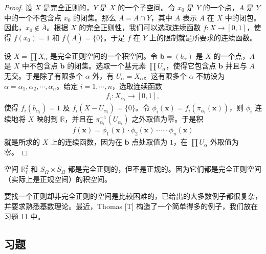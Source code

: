 \begin{proof}
设 $X$ 是完全正则的，$Y$ 是 $X$ 的一个子空间。令 $x_{0}$ 是 $Y$ 的一个点，$A$ 是 $Y$ 中的一个不包含点 $x_{0}$ 的闭集。那么 $A=\overline{A}\cap Y$，其中 $\overline{A}$ 表示 $A$ 在 $X$ 中的闭包。因此，$x_{0}\notin\overline{A}$。根据 $X$ 的完全正则性，我们可以选取连续函数 $f\colon X\to[0,1]$，使得 $f(x_{0})=1$ 和 $f(\overline{A})=\{0\}$。于是 $f$ 在 $Y$ 上的限制就是所要求的连续函数。

设 $X=\prod X_{\alpha}$ 是完全正则空间的一个积空间。令 $\boldsymbol{b}=(b_{\alpha})$ 是 $X$ 的一个点，$A$ 是 $X$ 中不包含点 $\boldsymbol{b}$ 的闭集。选取一个基元素 $\prod U_{\alpha}$，使得它包含点 $\boldsymbol{b}$ 并且与 $A$ 无交。于是除了有限多个 $\alpha$ 外，有 $U_{\alpha}=X_{\alpha}$。这有限多个 $\alpha$ 不妨设为 $\alpha=\alpha_{1},\alpha_{2},\cdots,\alpha_{n}$。给定 $i=1,\cdots,n$，选取连续函数
\begin{align*}
f_{i}\colon X_{\alpha_{i}}\longrightarrow[0,1],
\end{align*}
使得 $f_{i}(b_{\alpha_{i}})=1$ 及 $f_{i}(X-U_{\alpha_{i}})=\{0\}$。令 $\phi_{i}(\boldsymbol{x})=f_{i}(\pi_{\alpha_{i}}(\boldsymbol{x}))$，则 $\phi_{i}$ 连续地将 $X$ 映射到 $\mathbb{R}$，并且在 $\pi_{\alpha_{i}}^{-1}(U_{\alpha_{i}})$ 之外取值为零。于是积
\begin{align*}
f(\boldsymbol{x})=\phi_{1}(\boldsymbol{x})\cdot\phi_{2}(\boldsymbol{x})\cdot\cdots\cdot\phi_{n}(\boldsymbol{x})
\end{align*}
就是所求的 $X$ 上的连续函数，因为在 $\boldsymbol{b}$ 点处取值为 $1$，在 $\prod U_{\alpha}$ 外取值为零。
\end{proof}

\begin{example}\label{example:ch04-completely-regular-not-normal}
空间 $\mathbb{R}_{\ell}^{2}$ 和 $S_{\Omega}\times\overline{S}_{\Omega}$ 都是完全正则的，但不是正规的。因为它们都是完全正则空间（实际上是正规空间）的积空间。

要找一个正则却非完全正则的空间是比较困难的，已给出的大多数例子都很复杂，并要求熟悉基数理论。最近，Thomas [T] 构造了一个简单得多的例子，我们放在习题 11 中。
\end{example}

\subsection*{习题}

